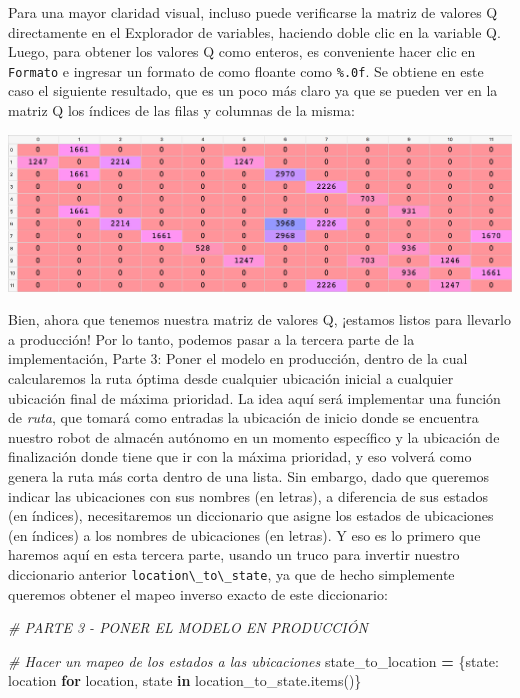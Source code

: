\documentclass[]{book}
\newenvironment{Shaded}{\begin{snugshade}}{\end{snugshade}}
\newcommand{\CommentTok}[1]{\textcolor[rgb]{0.56,0.35,0.01}{\textit{#1}}}
\newcommand{\ControlFlowTok}[1]{\textcolor[rgb]{0.13,0.29,0.53}{\textbf{#1}}}
\newcommand{\KeywordTok}[1]{\textcolor[rgb]{0.13,0.29,0.53}{\textbf{#1}}}
\newcommand{\NormalTok}[1]{#1}
\newcommand{\OperatorTok}[1]{\textcolor[rgb]{0.81,0.36,0.00}{\textbf{#1}}}
\begin{document}
Para una mayor claridad visual, incluso puede verificarse la matriz de valores Q directamente en el Explorador de variables, haciendo doble clic en la variable Q. Luego, para obtener los valores Q como enteros, es conveniente hacer clic en \texttt{Formato} e ingresar un formato de como floante como \texttt{\%.0f}. Se obtiene en este caso el siguiente resultado, que es un poco más claro ya que se pueden ver en la matriz Q los índices de las filas y columnas de la misma:

\includegraphics{Images/Q_Values_Variable_Explorer.png}

Bien, ahora que tenemos nuestra matriz de valores Q, ¡estamos listos para llevarlo a producción! Por lo tanto, podemos pasar a la tercera parte de la implementación, Parte 3: Poner el modelo en producción, dentro de la cual calcularemos la ruta óptima desde cualquier ubicación inicial a cualquier ubicación final de máxima prioridad. La idea aquí será implementar una función de \emph{ruta}, que tomará como entradas la ubicación de inicio donde se encuentra nuestro robot de almacén autónomo en un momento específico y la ubicación de finalización donde tiene que ir con la máxima prioridad, y eso volverá como genera la ruta más corta dentro de una lista. Sin embargo, dado que queremos indicar las ubicaciones con sus nombres (en letras), a diferencia de sus estados (en índices), necesitaremos un diccionario que asigne los estados de ubicaciones (en índices) a los nombres de ubicaciones (en letras). Y eso es lo primero que haremos aquí en esta tercera parte, usando un truco para invertir nuestro diccionario anterior \texttt{location\textbackslash{}\_to\textbackslash{}\_state}, ya que de hecho simplemente queremos obtener el mapeo inverso exacto de este diccionario:

\begin{Shaded}
\begin{Highlighting}[]
\CommentTok{# PARTE 3 - PONER EL MODELO EN PRODUCCIÓN}

\CommentTok{# Hacer un mapeo de los estados a las ubicaciones}
\NormalTok{state_to_location }\OperatorTok{=}\NormalTok{ \{state: location }\ControlFlowTok{for}\NormalTok{ location, state }\KeywordTok{in}\NormalTok{ location_to_state.items()\}}
\end{Highlighting}
\end{Shaded}
\end{document}
